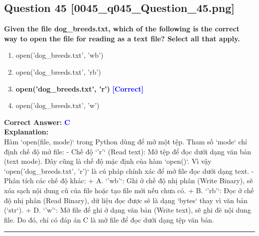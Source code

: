 \documentclass[11pt,a4paper]{article}
\begin{document}
\begin{minipage}{\textwidth}
\subsection*{Question 45 \quad \footnotesize{[0045_q045_Question_45.png]}}
\noindent \textbf{Given the file dog_breeds.txt, which of the following is the correct way to open the file for reading as a text file? Select all that apply.}

\begin{enumerate}[label=\Alph*.]
    \item open('dog_breeds.txt', 'wb')
    \item open('dog_breeds.txt', 'rb')
    \item \textbf{open('dog_breeds.txt', 'r')} \hfill \textcolor{blue}{\textbf{[Correct]}}
    \item open('dog_breeds.txt', 'w')
\end{enumerate}

\noindent \textbf{Correct Answer:} \textcolor{blue}{\textbf{C}} \\[4pt]
\noindent \textbf{Explanation:}\\
Hàm `open(file, mode)` trong Python dùng để mở một tệp. Tham số `mode` chỉ định chế độ mở file:\newline
- Chế độ `'r'` (Read text): Mở tệp để đọc dưới dạng văn bản (text mode). Đây cũng là chế độ mặc định của hàm `open()`. Vì vậy `open('dog_breeds.txt', 'r')` là cú pháp chính xác để mở file đọc dưới dạng text.\newline
- Phân tích các chế độ khác:\newline
  + A. `'wb'`: Ghi ở chế độ nhị phân (Write Binary), sẽ xóa sạch nội dung cũ của file hoặc tạo file mới nếu chưa có.\newline
  + B. `'rb'`: Đọc ở chế độ nhị phân (Read Binary), dữ liệu đọc được sẽ là dạng `bytes` thay vì văn bản (`str`).\newline
  + D. `'w'`: Mở file để ghi ở dạng văn bản (Write text), sẽ ghi đè nội dung file.\newline
Do đó, chỉ có đáp án C là mở file để đọc dưới dạng tệp văn bản.
\end{minipage}
\vspace{0.8cm}
\hrule
\vspace{0.5cm}
\end{document}
